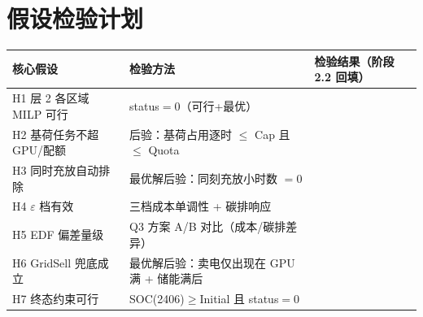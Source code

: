 \documentclass{internal-report}
\begin{document}
\section{假设检验计划}

\begin{center}
\footnotesize
\begin{tabular}{lll}
\toprule
核心假设 & 检验方法 & 检验结果（阶段 2.2 回填） \\
\midrule
H1 层 2 各区域 MILP 可行 & status$=0$（可行+最优） & \\
H2 基荷任务不超 GPU/配额 & 后验：基荷占用逐时 $\le$ Cap 且 $\le$ Quota & \\
H3 同时充放自动排除 & 最优解后验：同刻充放小时数 $=0$ & \\
H4 $\varepsilon$ 档有效 & 三档成本单调性 + 碳排响应 & \\
H5 EDF 偏差量级 & Q3 方案 A/B 对比（成本/碳排差异） & \\
H6 GridSell 兜底成立 & 最优解后验：卖电仅出现在 GPU 满 + 储能满后 & \\
H7 终态约束可行 & SOC(2406)$\ge$Initial 且 status$=0$ & \\
\bottomrule
\end{tabular}
\end{center}
\end{document}
